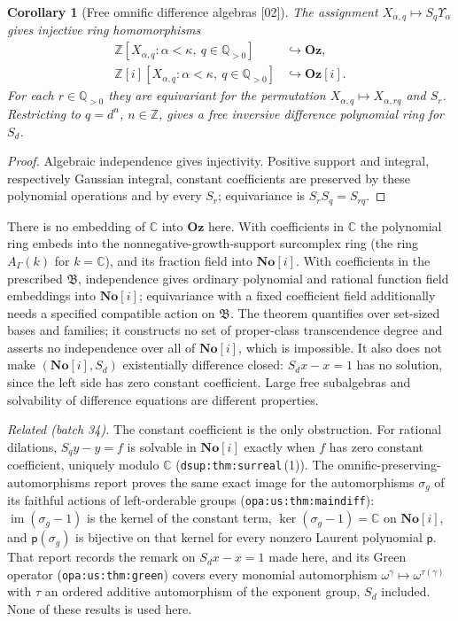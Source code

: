 \documentclass[11pt,letterpaper]{article}
\numberwithin{equation}{section}
\newtheorem{corollary}[corollary]{Corollary}
\theoremstyle{definition}
\theoremstyle{remark}
\newcommand{\Oz}{\mathbf{Oz}}
\newcommand{\SC}{\mathbf{No}[i]}
\newcommand{\Goz}{\mathbf{Oz}[i]}
\newcommand{\C}{\mathbb C}
\newcommand{\Q}{\mathbb Q}
\newcommand{\Z}{\mathbb Z}
\newcommand{\A}{A_\Gamma(k)}
\newcommand{\lbl}[1]{\nolinkurl{#1}}%
\newcommand{\src}[1]{\textup{[#1]}}%
\begin{document}
\begin{corollary}[Free omnific difference algebras \src{02}]
\label{adr:sr:cor:free}
The assignment $X_{\alpha,q}\mapsto S_q\Upsilon_\alpha$ gives injective ring
homomorphisms
\begin{align}
 \Z[X_{\alpha,q}:\alpha<\kappa,\ q\in\Q_{>0}]&\hookrightarrow\Oz,\label{adr:sr:eq:freeZ}\\
 \Z[i][X_{\alpha,q}:\alpha<\kappa,\ q\in\Q_{>0}]&\hookrightarrow\Goz.\label{adr:sr:eq:freeG}
\end{align}
For each $r\in\Q_{>0}$ they are equivariant for the permutation
$X_{\alpha,q}\mapsto X_{\alpha,rq}$ and $S_r$. Restricting to $q=d^n$,
$n\in\Z$, gives a free inversive difference polynomial ring for $S_d$.
\end{corollary}
\begin{proof}
Algebraic independence gives injectivity. Positive support and integral,
respectively Gaussian integral, constant coefficients are preserved by these
polynomial operations and by every $S_r$; equivariance is $S_rS_q=S_{rq}$.
\end{proof}

There is no embedding of $\C$ into $\Oz$ here. With coefficients in $\C$ the
polynomial ring embeds into the nonnegative-growth-support surcomplex ring
(the ring $\A$ for $k=\C$), and its fraction field into $\SC$. With
coefficients in the prescribed $\mathfrak B$, independence gives ordinary
polynomial and rational function field embeddings into $\SC$; equivariance
with a fixed coefficient field additionally needs a specified compatible
action on $\mathfrak B$. The theorem quantifies over set-sized bases and
families; it constructs no set of proper-class transcendence degree and asserts
no independence over all of $\SC$, which is impossible. It also does not make
$(\SC,S_d)$ existentially difference closed: $S_dx-x=1$ has no solution, since
the left side has zero constant coefficient. Large free subalgebras and
solvability of difference equations are different properties.

\emph{Related (batch 34).} The constant coefficient is the only obstruction.
For rational dilations, $S_qy-y=f$ is solvable in $\SC$ exactly when $f$ has
zero constant coefficient, uniquely modulo $\C$ (\lbl{dsup:thm:surreal}\,(1)).
The omnific-preserving-automorphisms report proves the same exact image
for the automorphisms $\sigma_g$ of its faithful actions of left-orderable
groups (\lbl{opa:us:thm:maindiff}): $\operatorname{im}(\sigma_g-1)$ is the
kernel of the constant term, $\ker(\sigma_g-1)=\C$ on $\SC$, and
$\mathsf p(\sigma_g)$ is bijective on that kernel for every nonzero Laurent
polynomial $\mathsf p$. That report records the remark on $S_dx-x=1$ made
here, and its Green operator (\lbl{opa:us:thm:green}) covers every monomial
automorphism $\omega^\gamma\mapsto\omega^{\tau(\gamma)}$ with $\tau$ an ordered
additive automorphism of the exponent group, $S_d$ included. None of these
results is used here.
\end{document}
